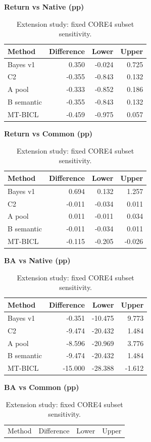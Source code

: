 \begin{table}[p]
\centering\small
\setlength{\tabcolsep}{3pt}
\renewcommand{\arraystretch}{1.12}
\caption{Extension study: fixed CORE4 subset sensitivity.}
\label{tab:u09-sensitivity-core4}
\textbf{Return vs Native (pp)}\par\smallskip
\begin{tabular}{lrrr}
\hline
Method & Difference & Lower & Upper \\
\hline
Bayes v1 & 0.350 & -0.024 & 0.725 \\
C2 & -0.355 & -0.843 & 0.132 \\
A pool & -0.333 & -0.852 & 0.186 \\
B semantic & -0.355 & -0.843 & 0.132 \\
MT-BICL & -0.459 & -0.975 & 0.057 \\
\hline
\end{tabular}\par\medskip
\textbf{Return vs Common (pp)}\par\smallskip
\begin{tabular}{lrrr}
\hline
Method & Difference & Lower & Upper \\
\hline
Bayes v1 & 0.694 & 0.132 & 1.257 \\
C2 & -0.011 & -0.034 & 0.011 \\
A pool & 0.011 & -0.011 & 0.034 \\
B semantic & -0.011 & -0.034 & 0.011 \\
MT-BICL & -0.115 & -0.205 & -0.026 \\
\hline
\end{tabular}\par\medskip
\textbf{BA vs Native (pp)}\par\smallskip
\begin{tabular}{lrrr}
\hline
Method & Difference & Lower & Upper \\
\hline
Bayes v1 & -0.351 & -10.475 & 9.773 \\
C2 & -9.474 & -20.432 & 1.484 \\
A pool & -8.596 & -20.969 & 3.776 \\
B semantic & -9.474 & -20.432 & 1.484 \\
MT-BICL & -15.000 & -28.388 & -1.612 \\
\hline
\end{tabular}\par\medskip
\textbf{BA vs Common (pp)}\par\smallskip
\begin{tabular}{lrrr}
\hline
Method & Difference & Lower & Upper \\

\end{tabular}
\end{table}
